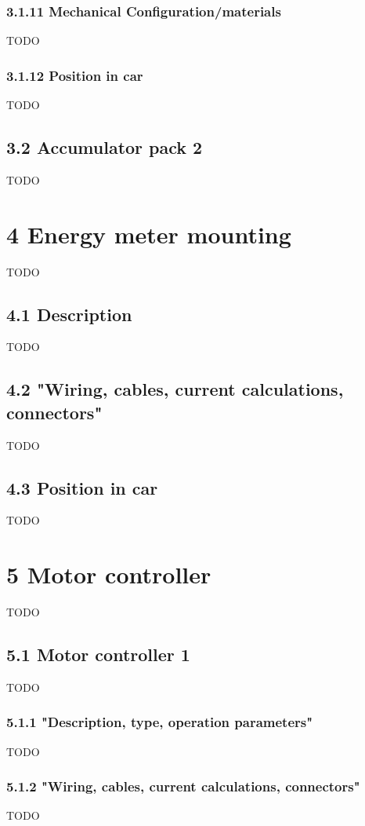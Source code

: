 \documentclass{article}
\begin{document}
\subsubsection*{3.1.11 Mechanical Configuration/materials}
TODO

\subsubsection*{3.1.12 Position in car}
TODO

\subsection*{3.2 Accumulator pack 2}
TODO

\section*{4 Energy meter mounting}
TODO

\subsection*{4.1 Description}
TODO

\subsection*{4.2 "Wiring, cables, current calculations, connectors"}
TODO

\subsection*{4.3 Position in car}
TODO

\section*{5 Motor controller}
TODO

\subsection*{5.1 Motor controller 1}
TODO

\subsubsection*{5.1.1 "Description, type, operation parameters"}
TODO

\subsubsection*{5.1.2 "Wiring, cables, current calculations, connectors"}
TODO
\end{document}
